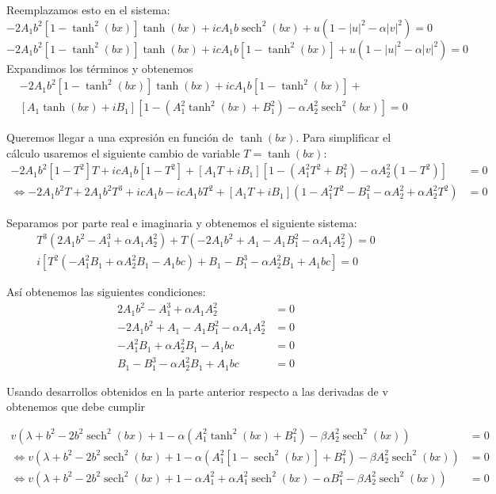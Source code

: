 \documentclass[letterpaper,11pt]{exam}
\newcommand{\sech}{\operatorname{sech}}
\theoremstyle{plain}
\begin{document}
Reemplazamos esto en el sistema:
\begin{equation*}
-2A_1b^2[1-\tanh^2(bx)]\tanh(bx)+icA_1b\sech^2(bx)+u(1-|u|^2-\alpha|v|^2)=0
\end{equation*}
\begin{equation*}
-2A_1b^2[1-\tanh^2(bx)]\tanh(bx)+icA_1b[1-\tanh^2(bx)]+u(1-|u|^2-\alpha|v|^2)=0
\end{equation*}
Expandimos los términos y obtenemos
\begin{equation*}
\begin{split}
    &-2A_1b^2[1-\tanh^2(bx)]\tanh(bx)+icA_1b[1-\tanh^2(bx)]+ \\&[A_1\tanh(bx)+iB_1][1-(A_1^2\tanh^2(bx)+B_1^2)-\alpha A_2^2\sech^2(bx)]=0
\end{split}
\end{equation*}

Queremos llegar a una expresión en función de $\tanh(bx)$. Para simplificar el cálculo usaremos el siguiente cambio de variable $T=\tanh(bx)$:
\begin{align*}
-2A_1b^2[1-T^2]T+icA_1b[1-T^2]+[A_1T+iB_1][1-(A_1^2T^2+B_1^2)-\alpha A_2^2(1-T^2)] &=0 \\
 \Leftrightarrow -2A_1b^2T+2A_1b^2T^3+icA_1b-icA_1bT^2 +[A_1T+iB_1](1-A_1^2T^2-B_1^2-\alpha A_2^2+\alpha A_2^2T^2)&=0
\end{align*}

Separamos por parte real e imaginaria y obtenemos el siguiente sistema:
\begin{align*}
    T^3(2A_1b^2-A_1^3+\alpha A_1A_2^2)+T(-2A_1b^2+A_1-A_1B_1^2-\alpha A_1A_2^2)=0 \\
    i[T^2(-A_1^2B_1+\alpha A_2^2B_1-A_1bc)+B_1-B_1^3-\alpha A_2^2B_1+A_1bc]=0
\end{align*}

Así obtenemos las siguientes condiciones:
\begin{align*}
    2A_1b^2-A_1^3+\alpha A_1A_2^2&=0 \\
    -2A_1b^2+A_1-A_1B_1^2-\alpha A_1A_2^2&=0 \\
    -A_1^2B_1+\alpha A_2^2B_1-A_1bc&=0\\
    B_1-B_1^3-\alpha A_2^2B_1+A_1bc&=0
\end{align*}


Usando desarrollos obtenidos en la parte anterior respecto a las derivadas de v obtenemos que debe cumplir 

\begin{align*}
    v(\lambda +b^2-2b^2\sech^2(bx)+1-\alpha(A_1^2\tanh^2(bx)+B_1^2 )-\beta A_2^2\sech^2(bx))&=0 \\
    \Leftrightarrow  v(\lambda +b^2-2b^2\sech^2(bx)+1-\alpha(A_1^2[1-\sech^2(bx)]+B_1^2 )-\beta A_2^2\sech^2(bx))&=0\\
    \Leftrightarrow v(\lambda +b^2-2b^2\sech^2(bx)+1-\alpha A_1^2+\alpha A_1^2\sech^2(bx)-\alpha B_1^2-\beta A_2^2\sech^2(bx))&=0
\end{align*}
\end{document}
